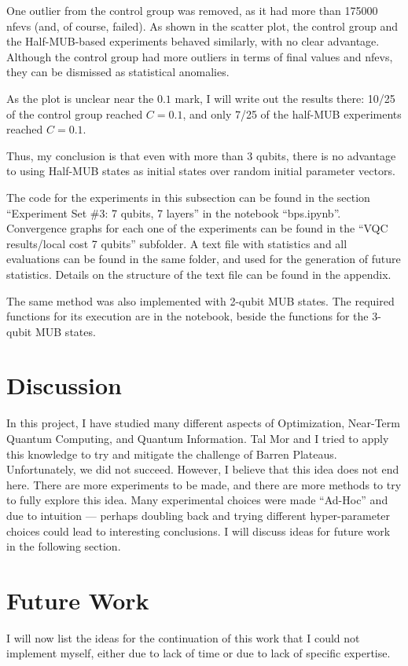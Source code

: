 \documentclass[a4paper,12pt]{article}
\begin{document}
One outlier from the control group was removed, as it had more than 175000 nfevs (and, of course, failed).
As shown in the scatter plot, the control group and the Half-MUB-based experiments behaved similarly, with no clear advantage.
Although the control group had more outliers in terms of final values and nfevs, they can be dismissed as statistical anomalies.

As the plot is unclear near the $0.1$ mark, I will write out the results there: 10/25 of the control group reached $C=0.1$, and only 7/25 of the half-MUB experiments reached $C=0.1$.

Thus, my conclusion is that even with more than 3 qubits, there is no advantage to using Half-MUB states as initial states over random initial parameter vectors.

The code for the experiments in this subsection can be found in the section ``Experiment Set \#3: 7 qubits, 7 layers'' in the notebook ``bps.ipynb''.
Convergence graphs for each one of the experiments can be found in the ``VQC results/local cost 7 qubits'' subfolder. A text file with statistics and all evaluations can be found in the same folder, and used for the generation of future statistics. Details on the structure of the text file can be found in the appendix.

The same method was also implemented with 2-qubit MUB states.
The required functions for its execution are in the notebook, beside the functions for the 3-qubit MUB states.


\section{Discussion}
In this project, I have studied many different aspects of Optimization, Near-Term Quantum Computing, and Quantum Information.
Tal Mor and I tried to apply this knowledge to try and mitigate the challenge of Barren Plateaus. Unfortunately, we did not succeed. However, I believe that this idea does not end here.
There are more experiments to be made, and there are more methods to try to fully explore this idea.
Many experimental choices were made ``Ad-Hoc'' and due to intuition --- perhaps doubling back and trying different hyper-parameter choices could lead to interesting conclusions.
I will discuss ideas for future work in the following section.

\section{Future Work}
I will now list the ideas for the continuation of this work that I could not implement myself, either due to lack of time or due to lack of specific expertise.
\end{document}

